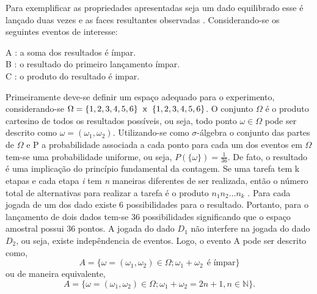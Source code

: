 Para exemplificar as propriedades apresentadas seja um  dado equilibrado esse
\'{e} lan\c{c}ado duas vezes e as faces resultantes observadas \cite{magalhaes}.
Considerando-se os seguintes eventos de interesse:

  \vspace{0.5cm} 
  \hspace{4cm}
  \begin{minipage}{9cm} 
	  A : a soma dos resultados \'{e} \'{i}mpar. \\ 
	  B : o resultado do primeiro lan\c{c}amento \'{i}mpar.  \\ C : o produto do resultado \'{e} impar.
  \end{minipage} 
  \vspace{0.5cm}
  \par 
Primeiramente deve-se definir um espa\c{c}o adequado para o experimento,
considerando-se $\Omega = \{1,2,3,4,5,6 \} \hspace{2mm} \text{x} \hspace{2mm} \{1,2,3,4,5,6 \}$. O conjunto
$\Omega$ \'e o produto cartesino de todos os resultados poss\'{i}veis, ou seja, todo ponto $\omega \in
\Omega$ pode ser descrito como $\omega = (\omega_1, \omega_2)$.  Utilizando-se como $\sigma$-\'{a}lgebra  o
conjunto das partes de $\Omega$ e P a probabilidade associada a cada ponto para cada um dos eventos em
$\Omega$ tem-se uma probabilidade uniforme, ou seja, $P(\{\omega \}) = \frac {1}{36}$. De fato, o resultado
\'{e} uma implica\c c\~ao do princ\'ipio fundamental da contagem.  Se uma tarefa tem k etapas e cada etapa
\textit{i} tem \textit{n} maneiras diferentes de ser realizada, ent\~{a}o  o n\'{u}mero total de
alternativas para realizar a tarefa \'{e} o produto $n_1 n_2 \dots n_k$ \cite{magalhaes}.  Para cada jogada
de um dos dado existe 6 possibilidades para o resultado.  Portanto, para o lan\c{c}amento de dois dados
tem-se 36 possibilidades significando que o espa\c{c}o amostral possui 36 pontos. A jogada do dado $D_1$
n\~{a}o interfere na jogada do dado $D_2$, ou seja, existe indep\^{e}ndencia de eventos.  Logo, o evento A
pode ser descrito como, 
	\begin{equation*} 
		A = \{ \omega = (\omega_1,\omega_2) \in \Omega; \omega_1 +
		\omega_2\ \ \textrm{\'{e} \'{i}mpar} \} 
	\end{equation*} ou de maneira equivalente, 
	\begin{equation*}
		  A = \{ \omega = (\omega_1,\omega_2) \in \Omega; \omega_1 + \omega_2  = 2n + 1, n \in \mathbb{N} \}.
	\end{equation*} 
